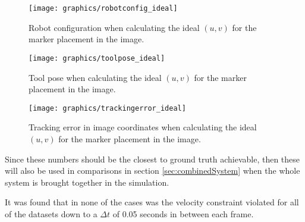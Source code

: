 \begin{figure}[H]
\centering
\texttt{[image: graphics/robotconfig\_ideal]}
\caption{Robot configuration when calculating the ideal $(u,v)$ for the marker placement in the image.}
\label{fig:robotconfig_ideal_1p}
\end{figure}

\begin{figure}[H]
\centering
\texttt{[image: graphics/toolpose\_ideal]}
\caption{Tool pose when calculating the ideal $(u,v)$ for the marker placement in the image.}
\label{fig:toolpose_ideal_1p}
\end{figure}


\begin{figure}[H]
\centering
\texttt{[image: graphics/trackingerror\_ideal]}
\caption{Tracking error in image coordinates when calculating the ideal $(u,v)$ for the marker placement in the image.}
\label{fig:trackingerror_ideal_1p}
\end{figure}


Since these numbers should be the closest to ground truth achievable, then these will also be used in comparisons in section \ref{sec:combinedSystem} when the whole system is brought together in the simulation.

It was found that in none of the cases was the velocity constraint violated for all of the datasets down to a $\Delta t$ of 0.05 seconds in between each frame.


